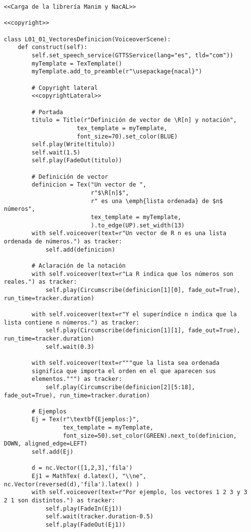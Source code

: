 \documentclass[11pt]{article}
\begin{document}
\begin{verbatim}
<<Carga de la librería Manim y NacAL>>

<<copyright>>

class L01_01_VectoresDefinicion(VoiceoverScene):
    def construct(self):
        self.set_speech_service(GTTSService(lang="es", tld="com"))        
        myTemplate = TexTemplate()
        myTemplate.add_to_preamble(r"\usepackage{nacal}")

        # Copyright lateral
        <<copyrightLateral>>
        
        # Portada
        titulo = Title(r"Definición de vector de \R[n] y notación",
                     tex_template = myTemplate,
                     font_size=70).set_color(BLUE)
        self.play(Write(titulo))
        self.wait(1.5)
        self.play(FadeOut(titulo))
	
        # Definición de vector
        definicion = Tex("Un vector de ",
                         r"$\R[n]$",
                         r" es una \emph{lista ordenada} de $n$ números",
                         tex_template = myTemplate,
                         ).to_edge(UP).set_width(13)
        with self.voiceover(text=r"Un vector de R n es una lista ordenada de números.") as tracker:
            self.add(definicion)
	
        # Aclaración de la notación
        with self.voiceover(text=r"La R indica que los números son reales.") as tracker:
            self.play(Circumscribe(definicion[1][0], fade_out=True), run_time=tracker.duration)
            
        with self.voiceover(text=r"Y el superíndice n indica que la lista contiene n números.") as tracker:
            self.play(Circumscribe(definicion[1][1], fade_out=True), run_time=tracker.duration)
            self.wait(0.3)
            
        with self.voiceover(text=r"""que la lista sea ordenada
        significa que importa el orden en el que aparecen sus
        elementos.""") as tracker:
            self.play(Circumscribe(definicion[2][5:18], fade_out=True), run_time=tracker.duration)
	
        # Ejemplos
        Ej = Tex(r"\textbf{Ejemplos:}",
                 tex_template = myTemplate,
                 font_size=50).set_color(GREEN).next_to(definicion, DOWN, aligned_edge=LEFT)
        self.add(Ej)
	
        d = nc.Vector([1,2,3],'fila')
        Ej1 = MathTex( d.latex(), "\\ne", nc.Vector(reversed(d),'fila').latex() ) 
        with self.voiceover(text=r"Por ejemplo, los vectores 1 2 3 y 3 2 1 son distintos.") as tracker:
            self.play(FadeIn(Ej1))
            self.wait(tracker.duration-0.5)
            self.play(FadeOut(Ej1))
	

\end{verbatim}
\end{document}
